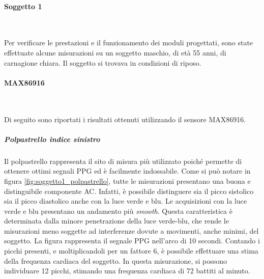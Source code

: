 \clearpage
{}
\paragraph{Soggetto 1}~

Per verificare le prestazioni e il funzionamento dei moduli progettati, sono state effettuate alcune misurazioni su un soggetto maschio, di età 55 anni, di carnagione chiara. Il soggetto si trovava in condizioni di riposo.

\paragraph{MAX86916}~

Di seguito sono riportati i risultati ottenuti utilizzando il sensore MAX86916.

\subparagraph{Polpastrello indice sinistro}

Il polpastrello rappresenta il sito di misura più utilizzato poiché permette di ottenere ottimi segnali PPG ed è facilmente indossabile. Come si può notare in figura \ref{fig:soggetto1_polpastrello}, tutte le misurazioni presentano una buona e distinguibile componente AC. Infatti, è possibile distinguere sia il picco sistolico sia il picco diastolico anche con la luce verde e blu. Le acquisizioni con la luce verde e blu presentano un andamento più \textit{smooth}. Questa caratteristica è determinata dalla minore penetrazione della luce verde-blu, che rende le misurazioni meno soggette ad interferenze dovute a movimenti, anche minimi, del soggetto. La figura rappresenta il segnale PPG nell'arco di 10 secondi. Contando i picchi presenti, e moltiplicandoli per un fattore 6, è possibile effettuare una stima della frequenza cardiaca del soggetto. In questa misurazione, si possono individuare 12 picchi, stimando una frequenza cardiaca di 72 battiti al minuto.

